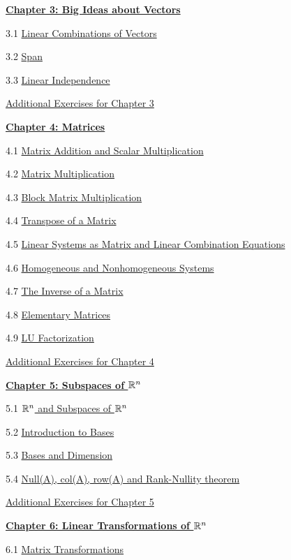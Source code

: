 \documentclass{ximera}
\begin{document}
\href{\xmbaseurl/XLAChapter_bigIdeas/main}{\textbf{Chapter 3: Big Ideas about Vectors}}
	
3.1	\href{\xmbaseurl/VEC-0040/main}{Linear Combinations of Vectors}
	
3.2	\href{\xmbaseurl/VEC-0090/main}{Span}
	
3.3	\href{\xmbaseurl/VEC-0100/main}{Linear Independence}
	
\href{\xmbaseurl/SUPX-0030/main}{Additional Exercises for Chapter 3}
	
\href{\xmbaseurl/XLAChapter_matrices/main}{\textbf{Chapter 4: Matrices}}
	
4.1	\href{\xmbaseurl/MAT-0010/main}{Matrix Addition and Scalar Multiplication}
	
4.2	\href{\xmbaseurl/MAT-0020/main}{Matrix Multiplication}
	
4.3	\href{\xmbaseurl/MAT-0023/main}{Block Matrix Multiplication}
	
4.4	\href{\xmbaseurl/MAT-0025/main}{Transpose of a Matrix}
	
4.5	\href{\xmbaseurl/MAT-0030/main}{Linear Systems as Matrix and Linear Combination Equations}
	
4.6	\href{\xmbaseurl/SYS-0050/main}{Homogeneous and Nonhomogeneous Systems}

4.7	\href{\xmbaseurl/MAT-0050/main}{The Inverse of a Matrix}
	
4.8	\href{\xmbaseurl/MAT-0060/main}{Elementary Matrices}
	
4.9	\href{\xmbaseurl/MAT-0070/main}{LU Factorization}
	
\href{\xmbaseurl/SUPX-0040/main}{Additional Exercises for Chapter 4}
	
\href{\xmbaseurl/XLAChapter_subspacesRn/main}{\textbf{Chapter 5: Subspaces of $\mathbb{R}^n$}}
	
5.1	\href{\xmbaseurl/VSP-0020/main}{$\mathbb{R}^n$ and Subspaces of $\mathbb{R}^n$}
	
5.2	\href{\xmbaseurl/VSP-0030/main}{Introduction to Bases}
	
5.3	\href{\xmbaseurl/VSP-0035/main}{Bases and Dimension}
	
5.4	\href{\xmbaseurl/VSP-0040/main}{Null(A), col(A), row(A) and Rank-Nullity theorem}
	
\href{\xmbaseurl/SUPX-0050/main}{Additional Exercises for Chapter 5}
	
\href{\xmbaseurl/XLAChapter_linTrans/main}{\textbf{Chapter 6: Linear Transformations of $\mathbb{R}^n$}}
	
6.1	\href{\xmbaseurl/LTR-0005/main}{Matrix Transformations}
	
\end{document}
